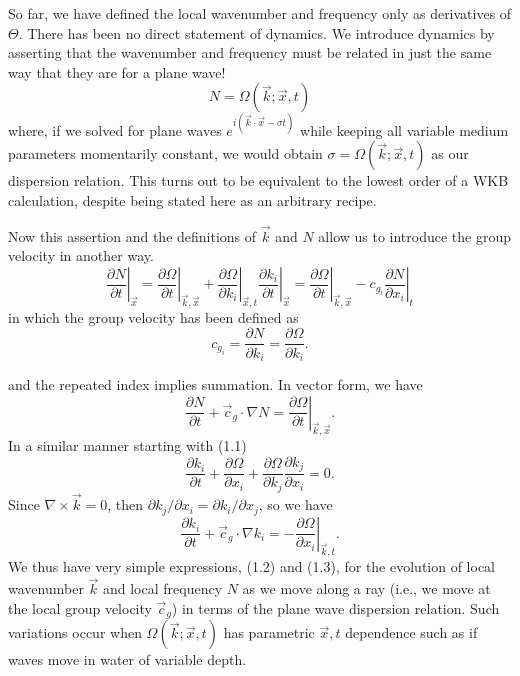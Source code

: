 So far, we have defined the local wavenumber and frequency only as derivatives of
$\Theta$. There has been no direct statement of dynamics. We introduce dynamics by
asserting that the wavenumber and frequency must be related in just the same way that
they are for a plane wave!
\[
	N=\Omega(\vec{k};\vec{x},t)
\]
where, if we solved for plane waves $e^{i(\vec{k}\cdot\vec{x}-\sigma t)}$ while keeping
all variable medium parameters momentarily constant, we would obtain
$\sigma=\Omega(\vec{k};\vec{x},t)$ as our dispersion relation. This turns out to be
equivalent to the lowest order of a WKB calculation, despite being stated here as an
arbitrary recipe.

Now this assertion and the definitions of $\vec{k}$ and $N$ allow us to introduce the
group velocity in another way.
\[
	\left.\frac{\partial N}{\partial t}\right|_{\vec{x}}
	=\left.\frac{\partial\Omega}{\partial t}\right|_{\vec{k},\vec{x}}
	+\left.\frac{\partial\Omega}{\partial k_i}\right|_{\vec{x},t}
	\left.\frac{\partial k_i}{\partial t}\right|_{\vec{x}}
	=\left.\frac{\partial\Omega}{\partial t}\right|_{\vec{k},\vec{x}}
	-c_{g_i}\left.\frac{\partial N}{\partial x_i}\right|_t
\]
in which the group velocity has been defined as
\[
	c_{g_i}=\frac{\partial N}{\partial k_i}=\frac{\partial\Omega}{\partial k_i}.
\]

\sourcepagebreak

and the repeated index implies summation. In vector form, we have
\begin{equation}
	\frac{\partial N}{\partial t}+\vec{c}_g\cdot\nabla N
	=\left.\frac{\partial\Omega}{\partial t}\right|_{\vec{k},\vec{x}}.
	\tag{1.2}
\end{equation}
In a similar manner starting with (1.1)
\[
	\frac{\partial k_i}{\partial t}
	+\frac{\partial\Omega}{\partial x_i}
	+\frac{\partial\Omega}{\partial k_j}
	\frac{\partial k_j}{\partial x_i}=0.
\]
Since $\nabla\times\vec{k}=0$, then
$\partial k_j/\partial x_i=\partial k_i/\partial x_j$, so we have
\begin{equation}
	\frac{\partial k_i}{\partial t}+\vec{c}_g\cdot\nabla k_i
	=-\left.\frac{\partial\Omega}{\partial x_i}\right|_{\vec{k},t}.
	\tag{1.3}
\end{equation}
We thus have very simple expressions, (1.2) and (1.3), for the evolution of local
wavenumber $\vec{k}$ and local frequency $N$ as we move along a ray (i.e., we move at
the local group velocity $\vec{c}_g$) in terms of the plane wave dispersion relation.
Such variations occur when $\Omega(\vec{k};\vec{x},t)$ has parametric $\vec{x},t$
dependence such as if waves move in water of variable depth.

